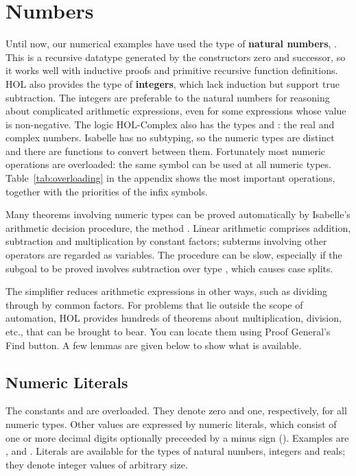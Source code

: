 
\section{Numbers}
\label{sec:numbers}

%
Until now, our numerical examples have used the type of \textbf{natural
numbers},
.  This is a recursive datatype generated by the constructors
zero  and successor, so it works well with inductive proofs and primitive
recursive function definitions.  HOL also provides the type
 of \textbf{integers}, which lack induction but support true
subtraction.  The integers are preferable to the natural numbers for reasoning about
complicated arithmetic expressions, even for some expressions whose
value is non-negative.  The logic HOL-Complex also has the types
 and : the real and complex numbers.  Isabelle has no 
subtyping,  so the numeric
types are distinct and there are functions to convert between them.
Fortunately most numeric operations are overloaded: the same symbol can be
used at all numeric types. Table~\ref{tab:overloading} in the appendix
shows the most important operations, together with the priorities of the
infix symbols.

%
Many theorems involving numeric types can be proved automatically by
Isabelle's arithmetic decision procedure, the method
.  Linear arithmetic comprises addition, subtraction
and multiplication by constant factors; subterms involving other operators
are regarded as variables.  The procedure can be slow, especially if the
subgoal to be proved involves subtraction over type , which 
causes case splits.  

The simplifier reduces arithmetic expressions in other
ways, such as dividing through by common factors.  For problems that lie
outside the scope of automation, HOL provides hundreds of
theorems about multiplication, division, etc., that can be brought to
bear.  You can locate them using Proof General's Find
button.  A few lemmas are given below to show what
is available.

\subsection{Numeric Literals}
\label{sec:numerals}

%
The constants  and  are overloaded.  They denote zero and one,
respectively, for all numeric types.  Other values are expressed by numeric
literals, which consist of one or more decimal digits optionally preceeded by
a minus sign (\isa{-}).  Examples are ,  and
.  Literals are available for the types of natural numbers,
integers and reals; they denote integer values of arbitrary size.

